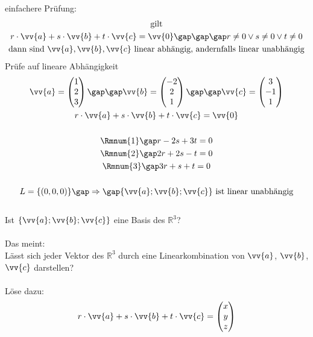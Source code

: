 einfachere Prüfung:
\begin{gather*}
  \text{gilt} \\
  r \cdot \vv{a} + s \cdot \vv{b} + t \cdot \vv{c} = \vv{0} \gap\gap\gap r \neq 0 \lor s \neq 0 \lor t \neq 0 \\
  \text{dann sind $\vv{a}, \vv{b}, \vv{c}$ linear abhängig, andernfalls linear unabhängig}
\end{gather*}
Prüfe auf lineare Abhängigkeit
\begin{gather*}
  \vv{a} = \begin{pmatrix}1 \\ 2 \\ 3\end{pmatrix} \gap\gap \vv{b} = \begin{pmatrix}-2 \\ 2 \\ 1\end{pmatrix} \gap\gap \vv{c} = \begin{pmatrix}3 \\ -1 \\ 1\end{pmatrix} \\
  r \cdot \vv{a} + s \cdot \vv{b} + t \cdot \vv{c} = \vv{0} \\\\
  \text{\Rmnum{1}} \gap r - 2s + 3t = 0 \\
  \text{\Rmnum{2}} \gap 2r + 2s - t = 0 \\
  \text{\Rmnum{3}} \gap 3r + s + t = 0 \\\\
  L = \{(0, 0, 0)\} \gap\Rightarrow\gap \text{$\left\{\vv{a}; \vv{b}; \vv{c}\right\}$ ist linear unabhängig}
\end{gather*} \\
Ist $\left\{\vv{a}; \vv{b}; \vv{c}\right\}$ eine Basis des $\mathbb{R}^3$? \\\\
Das meint: \\
Lässt sich jeder Vektor des $\mathbb{R}^3$ durch eine Linearkombination von $\vv{a}$, $\vv{b}$, $\vv{c}$ darstellen? \\\\
Löse dazu:
\begin{gather*}
  r \cdot \vv{a} + s \cdot \vv{b} + t \cdot \vv{c} = \begin{pmatrix}x \\ y \\ z\end{pmatrix}
\end{gather*}
